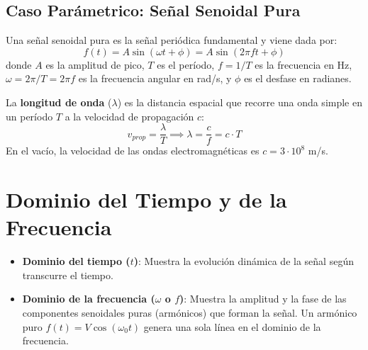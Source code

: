 \subsection{Caso Parámetrico: Señal Senoidal Pura}
Una señal senoidal pura es la señal periódica fundamental y viene dada por:
\begin{equation}
    f(t) = A \sin(\omega t + \phi) = A \sin(2\pi f t + \phi)
\end{equation}
donde $A$ es la amplitud de pico, $T$ es el período, $f = 1/T$ es la frecuencia en Hz, $\omega = 2\pi/T = 2\pi f$ es la frecuencia angular en rad/s, y $\phi$ es el desfase en radianes.

La \textbf{longitud de onda} ($\lambda$) es la distancia espacial que recorre una onda simple en un período $T$ a la velocidad de propagación $c$:
\begin{equation}
    v_{prop} = \frac{\lambda}{T} \implies \lambda = \frac{c}{f} = c \cdot T
\end{equation}
En el vacío, la velocidad de las ondas electromagnéticas es $c = 3 \cdot 10^8$ m/s.

\newpage
\section{Dominio del Tiempo y de la Frecuencia}

\begin{tcolorbox}[cajaResumen, title={Representación Temporal vs. Frecuencial}]
\begin{itemize}[leftmargin=*]
    \item \textbf{Dominio del tiempo ($t$)}: Muestra la evolución dinámica de la señal según transcurre el tiempo.
    \item \textbf{Dominio de la frecuencia ($\omega$ o $f$)}: Muestra la amplitud y la fase de las componentes senoidales puras (armónicos) que forman la señal. Un armónico puro $f(t) = V \cos(\omega_0 t)$ genera una sola línea en el dominio de la frecuencia.
\end{itemize}
\end{tcolorbox}

